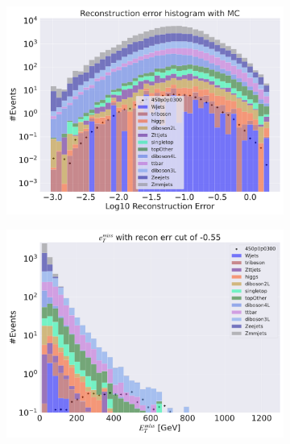 \begin{figure}[H]
    \centering
    \begin{subfigure}{.40\textwidth}
        \includegraphics[width=\textwidth]{Figures/VAE_testing/big/3lep/b_data_recon_big_rm3_feats_sig_450p0p0300.pdf}
        \caption{ }
        \label{fig:VAE_3lep_big_450_3}
    \end{subfigure}
    \hfill
    \begin{subfigure}{.40\textwidth}
        \includegraphics[width=\textwidth]{Figures/VAE_testing/big/3lep/b_data_recon_big_rm3_feats_sig_450p0p0300_etmiss_recon_errcut_-0.55.pdf}
        \caption{}
        \label{fig:VAE_3lep_big_etmiss_450_3}
    \end{subfigure}

\end{figure}
